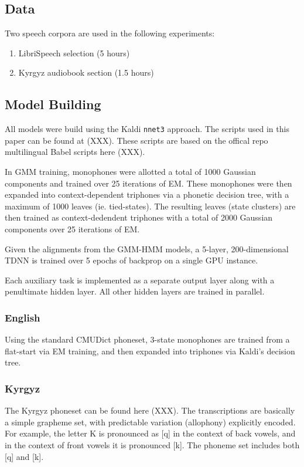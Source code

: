 \documentclass[a4paper]{article}
\begin{document}
\subsection{Data}

Two speech corpora are used in the following experiments:

\begin{enumerate}
\item LibriSpeech selection (5 hours)
\item Kyrgyz audiobook section (1.5 hours)
\end{enumerate}

\subsection{Model Building}

All models were build using the Kaldi \texttt{nnet3} approach. The scripts used in this paper can be found at (XXX). These scripts are based on the offical repo multilingual Babel scripts here (XXX).

In GMM training, monophones were allotted a total of 1000 Gaussian components and trained over 25 iterations of EM. These monophones were then expanded into context-dependent triphones via a phonetic decision tree, with a maximum of 1000 leaves (ie. tied-states). The resulting leaves (state clusters) are then trained as context-dedendent triphones with a total of 2000 Gaussian components over 25 iterations of EM.

Given the alignments from the GMM-HMM models, a 5-layer, 200-dimensional TDNN is trained over 5 epochs of backprop on a single GPU instance.

Each auxiliary task is implemented as a separate output layer along with a penultimate hidden layer. All other hidden layers are trained in parallel. 

\subsubsection{English}

Using the standard CMUDict phoneset, 3-state monophones are trained from a flat-start via EM training, and then expanded into triphones via Kaldi's decision tree.

\subsubsection{Kyrgyz}

The Kyrgyz phoneset can be found here (XXX). The transcriptions are basically a simple grapheme set, with predictable variation (allophony) explicitly encoded. For example, the letter K is pronounced as [q] in the context of back vowels, and in the context of front vowels it is pronounced [k]. The phoneme set includes both [q] and [k].
\end{document}
